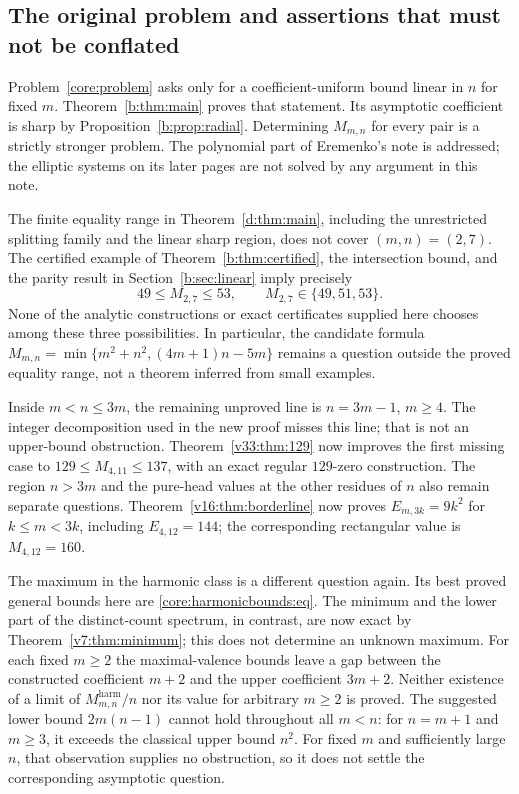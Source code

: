 \documentclass[UTF8,11pt]{ctexart}
\theoremstyle{definition}
\numberwithin{equation}{section}
\begin{document}
\subsection{The original problem and assertions that must not be conflated}
Problem~\ref{core:problem} asks only for a coefficient-uniform bound linear in
$n$ for fixed $m$. Theorem~\ref{b:thm:main} proves that statement. Its
asymptotic coefficient is sharp by Proposition~\ref{b:prop:radial}.
Determining $M_{m,n}$ for every pair is a strictly stronger problem.
The polynomial part of Eremenko's note is addressed; the elliptic systems
on its later pages are not solved by any argument in this note.

The finite equality range in Theorem~\ref{d:thm:main}, including
the unrestricted splitting family and the linear sharp region, does
not cover $(m,n)=(2,7)$. The certified example of
Theorem~\ref{b:thm:certified}, the intersection bound, and the parity result
in Section~\ref{b:sec:linear} imply precisely
\[
 49\le M_{2,7}\le53,\qquad M_{2,7}\in\{49,51,53\}.
\]
None of the analytic constructions or exact certificates supplied here
chooses among these three possibilities. In particular, the candidate
formula $M_{m,n}=\min\{m^2+n^2,(4m+1)n-5m\}$ remains a question outside
the proved equality range, not a theorem inferred from small examples.

Inside $m<n\le3m$, the remaining unproved line is $n=3m-1$,
$m\ge4$. The integer decomposition used in the new proof misses
this line; that is not an upper-bound obstruction. Theorem~\ref{v33:thm:129}
now improves the first missing case to $129\le M_{4,11}\le137$,
with an exact regular $129$-zero construction. The region
$n>3m$ and the pure-head values at the other residues of $n$
also remain separate questions. Theorem~\ref{v16:thm:borderline}
now proves $E_{m,3k}=9k^2$ for $k\le m<3k$, including
$E_{4,12}=144$; the corresponding rectangular value is $M_{4,12}=160$.

The maximum in the harmonic class is a different question again. Its
best proved general bounds here are \eqref{core:harmonicbounds:eq}.
The minimum and the lower part of the distinct-count spectrum,
in contrast, are now exact by Theorem~\ref{v7:thm:minimum};
this does not determine an unknown maximum.
For each fixed $m\ge2$ the maximal-valence bounds leave a gap between the constructed coefficient
$m+2$ and the upper coefficient $3m+2$. Neither existence of a limit of
$M^{\mathrm{harm}}_{m,n}/n$ nor its value for arbitrary $m\ge2$ is proved.
The suggested lower bound $2m(n-1)$ cannot hold throughout all $m<n$:
for $n=m+1$ and $m\ge3$, it exceeds the classical upper bound $n^2$.
For fixed $m$ and sufficiently large $n$, that observation supplies no
obstruction, so it does not settle the corresponding asymptotic question.
\end{document}
